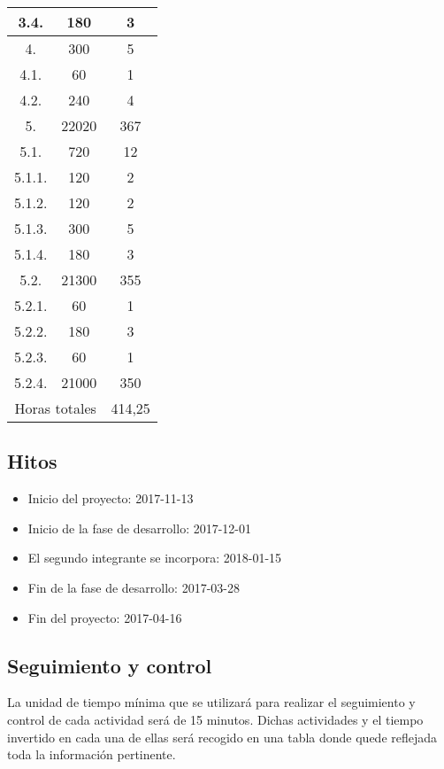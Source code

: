 \begin{longtable}{c|c|c}
3.4. & 180 & 3 \\ \hline
4. & 300 & 5 \\ \hline
4.1. & 60 & 1 \\ \hline
4.2. & 240 & 4 \\ \hline
5. & 22020 & 367 \\ \hline
5.1. & 720 & 12 \\ \hline
5.1.1. & 120 & 2 \\ \hline
5.1.2. & 120 & 2 \\ \hline
5.1.3. & 300 & 5 \\ \hline
5.1.4. & 180 & 3 \\ \hline
5.2. & 21300 & 355 \\ \hline
5.2.1. & 60 & 1 \\ \hline
5.2.2. & 180 & 3 \\ \hline
5.2.3. & 60 & 1 \\ \hline
5.2.4. & 21000 & 350 \\ \hline
\multicolumn{2}{c|}{Horas totales} & 414,25 \\
\end{longtable}

\subsection{Hitos}
\begin{itemize}
  \item Inicio del proyecto: 2017-11-13
  \item Inicio de la fase de desarrollo: 2017-12-01
  \item El segundo integrante se incorpora: 2018-01-15
  \item Fin de la fase de desarrollo: 2017-03-28
  \item Fin del proyecto: 2017-04-16
\end{itemize}

\subsection{Seguimiento y control}
\label{subsec:syc:timeManagement}
La unidad de tiempo mínima que se utilizará para realizar el seguimiento y
control de cada actividad será de 15 minutos. Dichas actividades y el tiempo
invertido en cada una de ellas será recogido en una tabla donde quede reflejada
toda la información pertinente.
